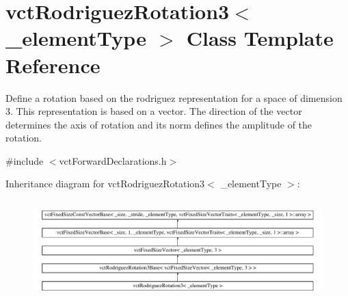 \hypertarget{classvct_rodriguez_rotation3}{\section{vct\-Rodriguez\-Rotation3$<$ \-\_\-element\-Type $>$ Class Template Reference}
\label{classvct_rodriguez_rotation3}
}


Define a rotation based on the rodriguez representation for a space of dimension 3. This representation is based on a vector. The direction of the vector determines the axis of rotation and its norm defines the amplitude of the rotation.  




{\ttfamily \#include $<$vct\-Forward\-Declarations.\-h$>$}

Inheritance diagram for vct\-Rodriguez\-Rotation3$<$ \-\_\-element\-Type $>$\-:\begin{figure}[H]
\begin{center}
\leavevmode
\includegraphics[height=3.888889cm]{dd/dc9/classvct_rodriguez_rotation3}
\end{center}
\end{figure}
